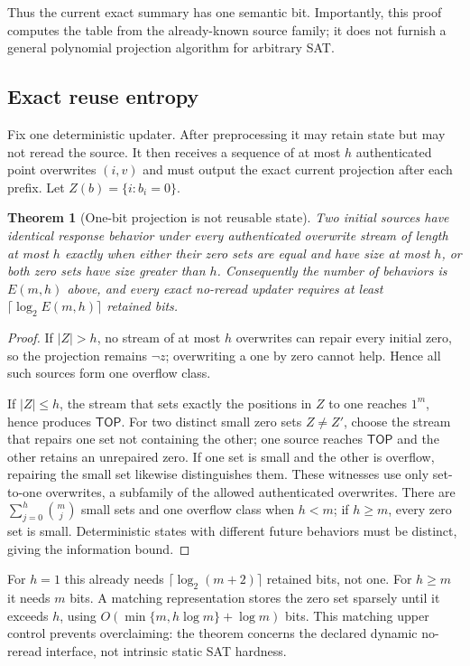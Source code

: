 \documentclass[11pt]{article}
\newtheorem{theorem}{Theorem}
\newcommand{\TOP}{\mathsf{TOP}}
\begin{document}
Thus the current exact summary has one semantic bit.  Importantly, this proof computes the table from the already-known source family; it does not furnish a general polynomial projection algorithm for arbitrary SAT.

\subsection{Exact reuse entropy}
Fix one deterministic updater.  After preprocessing it may retain state but may not reread the source.  It then receives a sequence of at most $h$ authenticated point overwrites $(i,v)$ and must output the exact current projection after each prefix.  Let $Z(b)=\{i:b_i=0\}$.

\begin{theorem}[One-bit projection is not reusable state]
Two initial sources have identical response behavior under every authenticated overwrite stream of length at most $h$ exactly when either their zero sets are equal and have size at most $h$, or both zero sets have size greater than $h$.  Consequently the number of behaviors is $E(m,h)$ above, and every exact no-reread updater requires at least $\lceil\log_2E(m,h)\rceil$ retained bits.
\end{theorem}
\begin{proof}
If $|Z|>h$, no stream of at most $h$ overwrites can repair every initial zero, so the projection remains $\neg z$; overwriting a one by zero cannot help.  Hence all such sources form one overflow class.

If $|Z|\le h$, the stream that sets exactly the positions in $Z$ to one reaches $1^m$, hence produces $\TOP$.  For two distinct small zero sets $Z\ne Z'$, choose the stream that repairs one set not containing the other; one source reaches $\TOP$ and the other retains an unrepaired zero.  If one set is small and the other is overflow, repairing the small set likewise distinguishes them.  These witnesses use only set-to-one overwrites, a subfamily of the allowed authenticated overwrites.  There are $\sum_{j=0}^h\binom mj$ small sets and one overflow class when $h<m$; if $h\ge m$, every zero set is small.  Deterministic states with different future behaviors must be distinct, giving the information bound.
\end{proof}

For $h=1$ this already needs $\lceil\log_2(m+2)\rceil$ retained bits, not one.  For $h\ge m$ it needs $m$ bits.  A matching representation stores the zero set sparsely until it exceeds $h$, using $O(\min\{m,h\log m\}+\log m)$ bits.  This matching upper control prevents overclaiming: the theorem concerns the declared dynamic no-reread interface, not intrinsic static SAT hardness.
\end{document}
